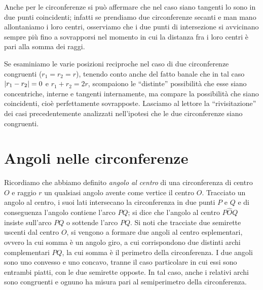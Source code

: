 Anche per le circonferenze si può affermare che nel caso siano tangenti lo sono in due punti coincidenti; infatti se prendiamo due circonferenze secanti e man mano allontaniamo i loro centri, osserviamo che i due punti di intersezione si avvicinano sempre più fino a sovrapporsi nel momento in cui la distanza fra i loro centri è pari alla somma dei raggi.

\begin{figure}[htb]
	\centering
\end{figure}

Se esaminiamo le varie posizioni reciproche nel caso di due circonferenze congruenti ($r_1 = r_2 = r$), tenendo conto anche del fatto banale che in tal caso $\left|r_1 - r_2\right| = 0$ e $r_1 + r_2 = 2r$, scompaiono le ``distinte'' possibilità che esse siano concentriche, interne e tangenti internamente, ma compare la possibilità che siano coincidenti, cioè perfettamente sovrapposte.
Lasciamo al lettore la ``rivisitazione'' dei casi precedentemente analizzati nell'ipotesi che le due circonferenze siano congruenti.

\section{Angoli nelle circonferenze}\label{sect:angoli_circonferenze}

\noindent\begin{minipage}{0.6\textwidth}\parindent15pt
Ricordiamo che abbiamo definito \emph{angolo al centro} di una circonferenza di centro $O$ e raggio $r$ un qualsiasi angolo avente come vertice il centro $O$.
Tracciato un angolo al centro, i suoi lati intersecano la circonferenza in due punti $P$ e $Q$ e di conseguenza l'angolo contiene l'arco $PQ$; si dice che l'angolo al centro $P\widehat{O}Q$ insiste sull'arco $PQ$ o sottende l'arco $PQ$.
Si noti che tracciate due semirette uscenti dal centro $O$, si vengono a formare due angoli al centro esplementari, ovvero la cui somma è un angolo giro, a cui corrispondono due distinti archi complementari $PQ$, la cui somma è il perimetro della circonferenza. 
I due angoli sono uno convesso e uno concavo, tranne il caso particolare in cui essi sono entrambi piatti, con le due semirette opposte. In tal caso, anche i relativi archi sono congruenti e ognuno ha misura pari al semiperimetro della circonferenza.
\end{minipage}\hfil
\begin{minipage}{0.4\textwidth}
	\centering
\end{minipage}

